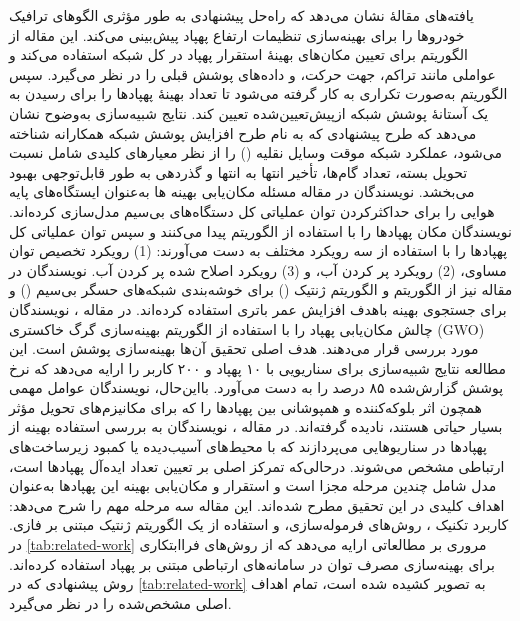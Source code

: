 یافته‌های مقالهٔ \cite{Islam2022} نشان می‌دهد که راه‌حل پیشنهادی به طور مؤثری الگوهای ترافیک خودروها را برای بهینه‌سازی تنظیمات ارتفاع پهپاد پیش‌بینی می‌کند. این مقاله از الگوریتم  برای تعیین مکان‌های بهینهٔ استقرار پهپاد در کل شبکه استفاده می‌کند و عواملی مانند تراکم، جهت حرکت، و داده‌های پوشش قبلی را در نظر می‌گیرد. سپس الگوریتم  به‌صورت تکراری به کار گرفته می‌شود تا تعداد بهینهٔ پهپادها را برای رسیدن به یک آستانهٔ پوشش شبکه ازپیش‌تعیین‌شده تعیین کند. نتایج شبیه‌سازی به‌وضوح نشان می‌دهد که طرح پیشنهادی که به نام طرح افزایش پوشش شبکه همکارانه شناخته می‌شود، عملکرد شبکه موقت وسایل نقلیه () را از نظر معیارهای کلیدی شامل نسبت تحویل بسته، تعداد گام‌ها، تأخیر انتها به انتها و گذردهی به طور قابل‌توجهی بهبود می‌بخشد.
نویسندگان در مقاله \cite{Shakhatreh2021} مسئله مکان‌یابی بهینه ها به‌عنوان ایستگاه‌های پایه هوایی را برای حداکثرکردن توان عملیاتی کل دستگاه‌های بی‌سیم مدل‌سازی کرده‌اند. نویسندگان مکان پهپادها را با استفاده از الگوریتم  پیدا می‌کنند و سپس توان عملیاتی کل پهپادها را با استفاده از سه رویکرد مختلف به دست می‌آورند: (1) رویکرد تخصیص توان مساوی، (2) رویکرد پر کردن آب، و (3) رویکرد اصلاح شده پر کردن آب. 
نویسندگان در مقاله \cite{Abu-Baker2023} نیز از الگوریتم  و الگوریتم ژنتیک () برای خوشه‌بندی شبکه‌های حسگر بی‌سیم () و برای جستجوی بهینه باهدف افزایش عمر باتری استفاده کرده‌اند.
در مقاله \cite{Ouamri2022}، نویسندگان چالش مکان‌یابی پهپاد را با استفاده از الگوریتم بهینه‌سازی گرگ خاکستری (\gls{GWO}) مورد بررسی قرار می‌دهند. هدف اصلی تحقیق آن‌ها بهینه‌سازی پوشش است. این مطالعه نتایج شبیه‌سازی برای سناریویی با ۱۰ پهپاد و ۲۰۰ کاربر را ارایه می‌دهد که نرخ پوشش گزارش‌شده ۸۵ درصد را به دست می‌آورد. بااین‌حال، نویسندگان عوامل مهمی همچون اثر بلوکه‌کننده و همپوشانی بین پهپادها را که برای مکانیزم‌های تحویل مؤثر بسیار حیاتی هستند، نادیده گرفته‌اند.
در مقاله \cite{Mandloi2023}، نویسندگان به بررسی استفاده بهینه از پهپادها در سناریوهایی می‌پردازند که با محیط‌های آسیب‌دیده یا کمبود زیرساخت‌های ارتباطی مشخص می‌شوند. درحالی‌که تمرکز اصلی بر تعیین تعداد ایده‌آل پهپادها است، مدل شامل چندین مرحله مجزا است و استقرار و مکان‌یابی بهینه این پهپادها به‌عنوان اهداف کلیدی در این تحقیق مطرح شده‌اند. این مقاله سه مرحله مهم را شرح می‌دهد: کاربرد تکنیک ، روش‌های فرموله‌سازی، و استفاده از یک الگوریتم ژنتیک مبتنی بر فازی.
در \autoref{tab:related-work} مروری بر مطالعاتی ارایه می‌دهد که از روش‌های فراابتکاری برای بهینه‌سازی مصرف توان در سامانه‌های ارتباطی مبتنی بر پهپاد استفاده کرده‌اند. روش پیشنهادی که در \autoref{tab:related-work} به تصویر کشیده شده است، تمام اهداف اصلی مشخص‌شده را در نظر می‌گیرد.

